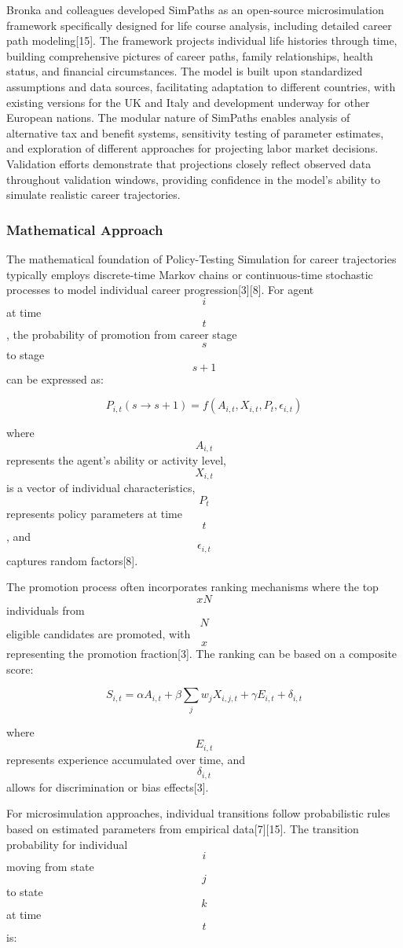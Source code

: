 \documentclass[main.tex]{subfiles}
\begin{document}
Bronka and colleagues developed SimPaths as an open-source microsimulation framework specifically designed for life course analysis, including detailed career path modeling[15]. The framework projects individual life histories through time, building comprehensive pictures of career paths, family relationships, health status, and financial circumstances. The model is built upon standardized assumptions and data sources, facilitating adaptation to different countries, with existing versions for the UK and Italy and development underway for other European nations. The modular nature of SimPaths enables analysis of alternative tax and benefit systems, sensitivity testing of parameter estimates, and exploration of different approaches for projecting labor market decisions. Validation efforts demonstrate that projections closely reflect observed data throughout validation windows, providing confidence in the model's ability to simulate realistic career trajectories.

\subsubsection{Mathematical Approach}

The mathematical foundation of Policy-Testing Simulation for career trajectories typically employs discrete-time Markov chains or continuous-time stochastic processes to model individual career progression[3][8]. For agent $$i$$ at time $$t$$, the probability of promotion from career stage $$s$$ to stage $$s+1$$ can be expressed as:

$$P_{i,t}(s \rightarrow s+1) = f(A_{i,t}, X_{i,t}, P_t, \epsilon_{i,t})$$

where $$A_{i,t}$$ represents the agent's ability or activity level, $$X_{i,t}$$ is a vector of individual characteristics, $$P_t$$ represents policy parameters at time $$t$$, and $$\epsilon_{i,t}$$ captures random factors[8].

The promotion process often incorporates ranking mechanisms where the top $$xN$$ individuals from $$N$$ eligible candidates are promoted, with $$x$$ representing the promotion fraction[3]. The ranking can be based on a composite score:

$$S_{i,t} = \alpha A_{i,t} + \beta \sum_{j} w_j X_{i,j,t} + \gamma E_{i,t} + \delta_{i,t}$$

where $$E_{i,t}$$ represents experience accumulated over time, and $$\delta_{i,t}$$ allows for discrimination or bias effects[3].

For microsimulation approaches, individual transitions follow probabilistic rules based on estimated parameters from empirical data[7][15]. The transition probability for individual $$i$$ moving from state $$j$$ to state $$k$$ at time $$t$$ is:
\end{document}
